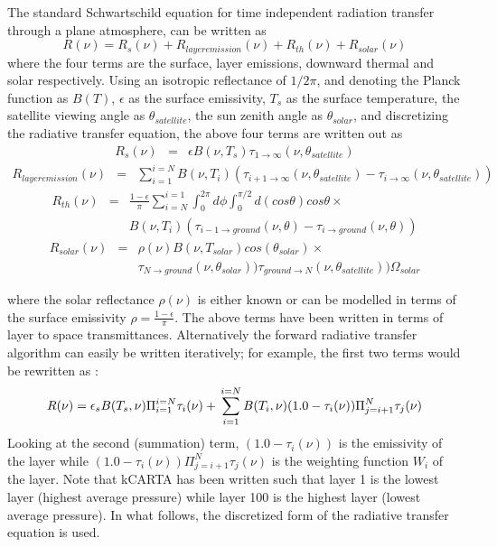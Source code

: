 \documentclass[11pt]{article}
\begin{document}
The standard Schwartschild equation for time independent radiation
transfer through a plane atmosphere, can be written as
\cite{goo:89,edw:92}
\begin{equation}
R(\nu) = R_{s}(\nu) + R_{layer emission}(\nu) + R_{th}(\nu) + R_{solar}(\nu)
\end{equation}
where the four terms are the surface, layer emissions, downward
thermal and solar respectively. Using an isotropic reflectance of
$1/2\pi$, and denoting the Planck function as $B(T)$, $\epsilon$ as
the surface emissivity, $T_{s}$ as the surface temperature, the
satellite viewing angle as $\theta_{satellite}$, the sun zenith angle
as $\theta_{solar}$, and discretizing the radiative transfer equation,
the above four terms are written out as
\begin{eqnarray*}
R_{s}(\nu) & = & \epsilon B(\nu,T_{s})
\tau_{1 \rightarrow \infty}(\nu,\theta_{satellite})
\end{eqnarray*}
\begin{eqnarray*}
R_{layer emission}(\nu) & = & \sum_{i=1}^{i=N} B(\nu,T_{i})
(\tau_{i+1 \rightarrow \infty}(\nu,\theta_{satellite})-
 \tau_{i \rightarrow \infty}(\nu,\theta_{satellite}))
\end{eqnarray*}
\begin{eqnarray*}
R_{th}(\nu) & = & \frac{1 - \epsilon}{\pi} \sum_{i=N}^{i=1} 
\int_{0}^{2\pi}d\phi 
\int_{0}^{\pi/2} d(cos\theta) cos\theta \times \\ 
& & B(\nu,T_{i})(\tau_{i-1 \rightarrow ground}(\nu,\theta)-
 \tau_{i \rightarrow ground}(\nu,\theta))
\end{eqnarray*}
\begin{eqnarray*}
R_{solar}(\nu) & = & \rho(\nu)
B(\nu,T_{solar})cos(\theta_{solar}) \times \\
& &                 \tau_{N \rightarrow ground}(\nu,\theta_{solar}))
                 \tau_{ground \rightarrow N}(\nu,\theta_{satellite}))
                 \Omega_{solar}
\end{eqnarray*}

where the solar reflectance $\rho(\nu)$ is either known or can be modelled 
in terms of the surface emissivity $\rho = \frac{1 - \epsilon}{\pi}$.
The above terms have been written in terms of layer to space transmittances. 
Alternatively the forward radiative transfer algorithm can easily be written 
iteratively; for example, the first two terms would be rewritten as : 
\begin{equation}
R(\nu) = \epsilon_{s}B(T_{s},\nu) \Pi_{i=1}^{i=N} \tau_{i}(\nu) + \\
         \sum_{i=1}^{i=N} B(T_{i},\nu) (1.0 - \tau_{i}(\nu))\\
         \Pi_{j=i+1}^{N} \tau_{j}(\nu)
\end{equation}
Looking at the second (summation) term, $(1.0 - \tau_{i}(\nu))$ is the 
emissivity of the layer while 
$(1.0 - \tau_{i}(\nu)) \Pi_{j=i+1}^{N} \tau_{j}(\nu)$ is the weighting 
function $W_{i}$ of the layer. Note that \textsf{kCARTA} has been written 
such that layer 1 is the lowest layer (highest average pressure) while layer 
100 is the highest layer (lowest average pressure). In what follows, the 
discretized form of the radiative transfer equation is used.
\end{document}
